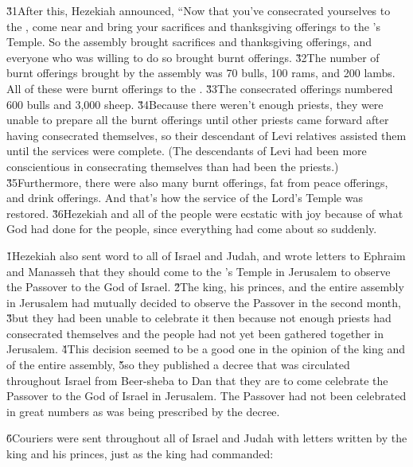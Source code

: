 \v{31}After this, Hezekiah announced, ``Now that you've consecrated yourselves to the , come near and bring your sacrifices and thanksgiving offerings to the 's Temple. So the assembly brought sacrifices and thanksgiving offerings, and everyone who was willing to do so brought burnt offerings. \v{32}The number of burnt offerings brought by the assembly was 70 bulls, 100 rams, and 200 lambs. All of these were burnt offerings to the . \v{33}The consecrated offerings numbered 600 bulls and 3,000 sheep. \v{34}Because there weren't enough priests, they were unable to prepare all the burnt offerings until other priests came forward after having consecrated themselves, so their descendant of Levi relatives assisted them until the services were complete. (The descendants of Levi had been more conscientious in consecrating themselves than had been the priests.) \v{35}Furthermore, there were also many burnt offerings, fat from peace offerings, and drink offerings. And that's how the service of the Lord's Temple was restored. \v{36}Hezekiah and all of the people were ecstatic with joy because of what God had done for the people, since everything had come about so suddenly.

\v{1}Hezekiah also sent word to all of Israel and Judah, and wrote letters to Ephraim and Manasseh that they should come to the 's Temple in Jerusalem to observe the Passover to the  God of Israel. \v{2}The king, his princes, and the entire assembly in Jerusalem had mutually decided to observe the Passover in the second month, \v{3}but they had been unable to celebrate it then because not enough priests had consecrated themselves and the people had not yet been gathered together in Jerusalem. \v{4}This decision seemed to be a good one in the opinion of the king and of the entire assembly, \v{5}so they published a decree that was circulated throughout Israel from Beer-sheba to Dan that they are to come celebrate the Passover to the  God of Israel in Jerusalem. The Passover had not been celebrated in great numbers as was being prescribed by the decree.

\v{6}Couriers were sent throughout all of Israel and Judah with letters written by the king and his princes, just as the king had commanded:

